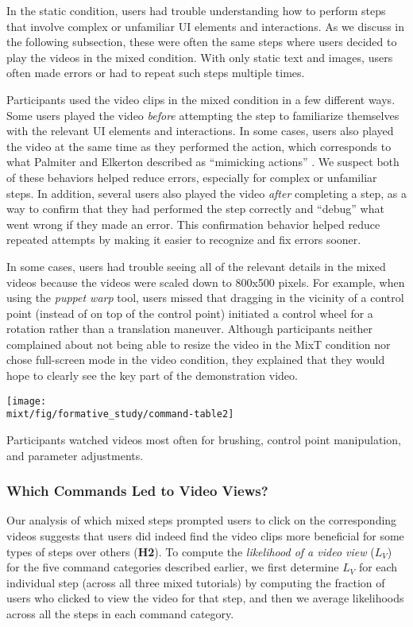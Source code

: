 In the static condition, users had trouble understanding how to perform steps that involve complex or unfamiliar UI elements and interactions. As we discuss in the following subsection, these were often the same steps where users decided to play the videos in the mixed condition. With only static text and images, users often made errors or had to repeat such steps multiple times.

Participants used the video clips in the mixed condition in a few different ways. Some users played the video \emph{before} attempting the step to familiarize themselves with the relevant UI elements and interactions. In some cases, users also played the video at the same time as they performed the action, which corresponds to what Palmiter and Elkerton described as ``mimicking actions'' \cite{Palmiter:1991:ADV:107792.107797}. We suspect both of these behaviors helped reduce errors, especially for complex or unfamiliar steps. In addition, several users also played the video \emph{after} completing a step, as a way to confirm that they had performed the step correctly and “debug” what went wrong if they made an error. This confirmation behavior helped reduce repeated attempts by making it easier to recognize and fix errors sooner.

In some cases, users had trouble seeing all of the relevant details in the mixed videos because the videos were scaled down to 800x500 pixels. For example, when using the \emph{puppet warp} tool, users missed that dragging in the vicinity of a control point (instead of on top of the control point) initiated a control wheel for a rotation rather than a translation maneuver. Although participants neither complained about not being able to resize the video in the MixT condition nor chose full-screen mode in the video condition, they explained that they would hope to clearly see the key part of the demonstration video.

\begin{table}[t]
  \centering
  \texttt{[image: \\mixt/fig/formative\_study/command-table2]}
  \caption{Participants watched videos most often for brushing, control point manipulation, and parameter adjustments.}
  \label{tab:formative_video_views}
\end{table}

\subsubsection{Which Commands Led to Video Views?}
Our analysis of which mixed steps prompted users to click on the corresponding videos suggests that users did indeed find the video clips more beneficial for some types of steps over others (\textbf{H2}). To compute the \emph{likelihood of a video view} ($L_V$) for the five command categories described earlier, we first determine $L_V$ for each individual step (across all three mixed tutorials) by computing the fraction of users who clicked to view the video for that step, and then we average likelihoods across all the steps in each command category.

